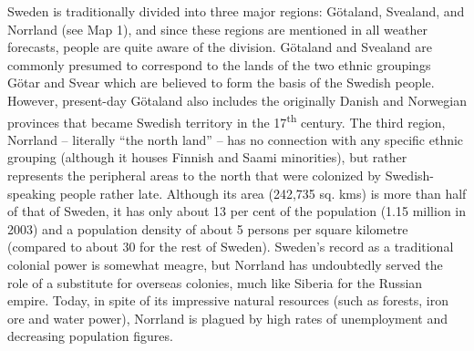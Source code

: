 \begin{styleBodyTextFirst}
Sweden is traditionally divided into three major regions: Götaland, Svealand, and Norrland (see Map 1), and since these regions are mentioned in all weather forecasts, people are quite aware of the division. Götaland and Svealand are commonly presumed to correspond to the lands of the two ethnic groupings Götar and Svear which are believed to form the basis of the Swedish people.  However, present-day Götaland also includes the originally Danish and Norwegian provinces that became Swedish territory in the 17\textsuperscript{th} century. The third region, Norrland – literally “the north land” – has no connection with any specific ethnic grouping (although it houses Finnish and Saami minorities), but rather represents the peripheral areas to the north that were colonized by Swedish-speaking people rather late. Although its area (242,735 sq. kms) is more than half of that of Sweden, it has only about 13 per cent of the population (1.15 million in 2003) and a population density of about 5 persons per square kilometre (compared to about 30 for the rest of Sweden). Sweden’s record as a traditional colonial power is somewhat meagre, but Norrland has undoubtedly served the role of a substitute for overseas colonies, much like Siberia for the Russian empire. Today, in spite of its impressive natural resources (such as forests, iron ore and water power), Norrland is plagued by high rates of unemployment and decreasing population figures. 

\end{styleBodyTextFirst}

